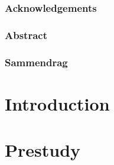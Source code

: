 \documentclass[english, a4paper, 12pt, twoside]{article}
\numberwithin{equation}{section} %
\def\biblio{\clearpage}
\begin{document}
\def\biblio{} %

%
\restoregeometry %

\pagestyle{preamble} %

\section*{Acknowledgements}
    
    
\cleardoublepage
\section*{Abstract}
    
 
\cleardoublepage
\section*{Sammendrag}
    

\cleardoublepage
{ %
\tableofcontents
}

\cleardoublepage %
{ 
\listoffigures}

\cleardoublepage %
{ 
\listoftables}


\cleardoublepage
\pagestyle{general}
\setcounter{page}{1} %


\part{Introduction}
\label{part:introduction}



\part{Prestudy}
\label{part:prestudy}

\end{document}
